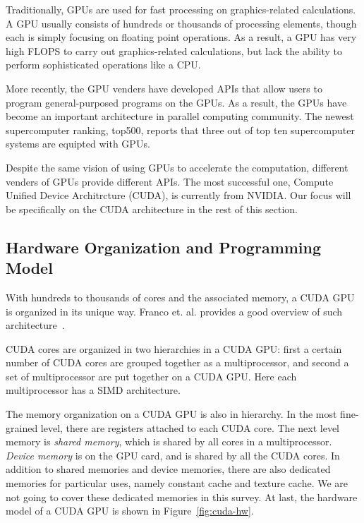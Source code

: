 Traditionally, GPUs are used for fast processing on 
graphics-related calculations.
%
A GPU usually consists of hundreds or thousands of processing elements,
though each is simply focusing on floating point operations. 
%
As a result, a GPU has very high FLOPS to carry out graphics-related
calculations, but lack the ability to 
perform sophisticated operations like a CPU.


More recently, the GPU venders have developed APIs that allow users
to program general-purposed programs on the GPUs. 
%
As a result, the GPUs have become an important architecture in 
parallel computing community.
%
The newest supercomputer ranking, top500, reports that three out of 
top ten supercomputer systems are equipted with GPUs.


Despite the same vision of using GPUs to accelerate the computation,
different venders of GPUs provide different APIs. 
%
The most successful one, Compute Unified Device Architrcture (CUDA), 
is currently from NVIDIA.
%
Our focus will be specifically on the CUDA architecture in the rest 
of this section.


\subsection{Hardware Organization and Programming Model}
\label{sec:cuda-model}
%
With hundreds to thousands of cores and the associated memory, 
a CUDA GPU is organized in its unique way. 
%
Franco et. al. provides a good overview of such 
architecture~\cite{franco2009parallel}.


CUDA cores are organized in two hierarchies in a CUDA GPU:
first a certain number of CUDA cores are grouped together as a multiprocessor,
and second a set of multiprocessor are put together on a CUDA GPU.
%
Here each multiprocessor has a SIMD architecture.


The memory organization on a CUDA GPU is also in hierarchy.
%
In the most fine-grained level, there are registers attached to each CUDA core.
%
The next level memory is \textit{shared memory}, which is shared by all cores
in a multiprocessor.
%
\textit{Device memory} is on the GPU card, and is shared by all the CUDA cores.
%
In addition to shared memories and device memories, there are also dedicated 
memories for particular uses, namely constant cache and texture cache.
%
We are not going to cover these dedicated memories in this survey.
%
At last, the hardware model of a CUDA GPU is shown in Figure~\ref{fig:cuda-hw}.
%



